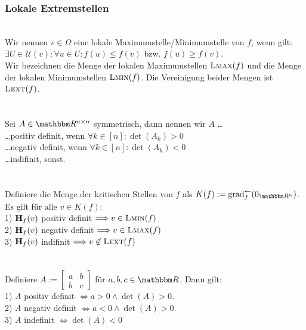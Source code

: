 \subsubsection*{Lokale Extremstellen}
 \\
Wir nennen \(v \in \Omega\) eine lokale Maximumstelle/Minimumstelle von \(f\), wenn gilt:\\
\(\exists U \in \mathcal U(v){:} \forall u \in U{:} f(u) \le f(v)\) bzw. \(f(u) \ge f(v)\). \\
Wir bezeichnen die Menge der lokalen Maximumstellen \(\text{\scshape Lmax}(f)\) und die Menge der lokalen Minimumstellen \(\text{\scshape Lmin}(f)\). Die Vereinigung beider Mengen ist \(\text{\scshape Lext}(f)\). \\ \\
 \\
Sei \(A\in\R^{n\times n}\) symmetrisch, dann nennen wir \(A\) \dots \\
\dots positiv definit, wenn \(\forall k \in [n]: \det(A_k) > 0\) \\
\dots negativ definit, wenn \(\forall k \in [n]: \det(A_k) < 0\) \\
\dots indifinit, sonst. \\ \\
 \\
Definiere die Menge der kritischen Stellen von \(f\) als \(K(f) := \grad_f^\leftarrow(0_{\R^n})\). \\
Es gilt für alle \(v \in K(f)\): \\
1) \(\textbf{H}_f(v)\) positiv definit \(\Longrightarrow v \in \text{\scshape Lmin}(f)\) \\
2) \(\textbf{H}_f(v)\) negativ definit \(\Longrightarrow v \in \text{\scshape Lmax}(f)\) \\
3) \(\textbf{H}_f(v)\) indifinit \(\Longrightarrow v \not\in \text{\scshape Lext}(f)\) \\ \\
 \\
Definiere \(A := \begin{bmatrix}
    a & b \\ b & c
\end{bmatrix}\) für \(a,b,c \in \R\). Dann gilt:\\
1) \(A\) positiv definit \(\Longleftrightarrow a > 0 \wedge \det(A) > 0\). \\
2) \(A\) negativ definit \(\Longleftrightarrow a < 0 \wedge \det(A) > 0\). \\
3) \(A\) indefinit \(\Longleftrightarrow \det(A) < 0\)
